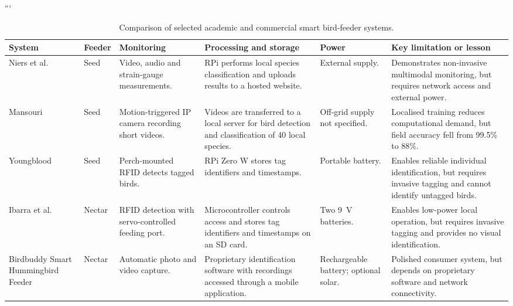 \begin{table}
\centering
\caption{Comparison of selected academic and commercial smart bird-feeder systems.}
\label{tab:existing-smart-feeders}

```
\small
\setlength{\tabcolsep}{4pt}
\renewcommand{\arraystretch}{1.15}

\begin{tabularx}{\textheight}{
    >{\raggedright\arraybackslash}p{0.13\textheight}
    >{\raggedright\arraybackslash}p{0.09\textheight}
    >{\raggedright\arraybackslash}X
    >{\raggedright\arraybackslash}X
    >{\raggedright\arraybackslash}p{0.11\textheight}
    >{\raggedright\arraybackslash}X
}
    \toprule
    \textbf{System}
    & \textbf{Feeder}
    & \textbf{Monitoring}
    & \textbf{Processing and storage}
    & \textbf{Power}
    & \textbf{Key limitation or lesson} \\
    \midrule

    Niers et al. \cite{NiersEtAl2022}
    & Seed
    & Video, audio and strain-gauge measurements.
    & RPi performs local species classification and uploads results to a hosted website.
    & External supply.
    & Demonstrates non-invasive multimodal monitoring, but requires network access and external power. \\

    Mansouri \cite{Mansouri2025}
    & Seed
    & Motion-triggered IP camera recording short videos.
    & Videos are transferred to a local server for bird detection and classification of 40 local species.
    & Off-grid supply not specified.
    & Localised training reduces computational demand, but field accuracy fell from 99.5\% to 88\%. \\

    Youngblood \cite{Youngblood2019}
    & Seed
    & Perch-mounted RFID detects tagged birds.
    & RPi Zero W stores tag identifiers and timestamps.
    & Portable battery.
    & Enables reliable individual identification, but requires invasive tagging and cannot identify untagged birds. \\

    Ibarra et al. \cite{IbarraEtAl2015}
    & Nectar
    & RFID detection with servo-controlled feeding port.
    & Microcontroller controls access and stores tag identifiers and timestamps on an SD card.
    & Two 9~V batteries.
    & Enables low-power local operation, but requires invasive tagging and provides no visual identification. \\

    Birdbuddy Smart Hummingbird Feeder
    \cite{BirdBuddyHummingbirdFeeder}
    & Nectar
    & Automatic photo and video capture.
    & Proprietary identification software with recordings accessed through a mobile application.
    & Rechargeable battery; optional solar.
    & Polished consumer system, but depends on proprietary software and network connectivity. \\


\end{tabularx}
\end{table}
